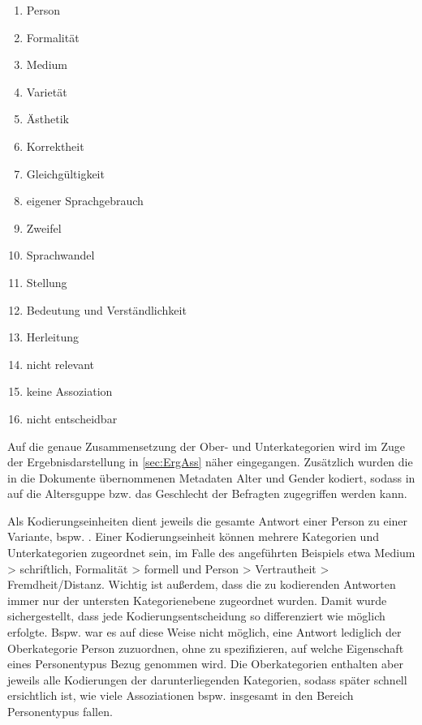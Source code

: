 \begin{multicols}{2}
\begin{enumerate}
\item Person
\item Formalität
\item Medium 
\item Varietät 
\item Ästhetik
\item Korrektheit 
\item Gleichgültigkeit 
\item eigener Sprachgebrauch
\item Zweifel
\item Sprachwandel 
\item Stellung 
\item Bedeutung und Verständlichkeit 
\item Herleitung 
\item nicht relevant 
\item keine Assoziation
\item nicht entscheidbar 
\end{enumerate}
\end{multicols}

\noindent Auf die genaue Zusammensetzung der Ober- und Unterkategorien wird im Zuge der Ergebnisdarstellung in \autoref{sec:ErgAss} näher eingegangen. 
Zusätzlich wurden die in die Dokumente übernommenen Metadaten Alter und Gender kodiert, sodass in \citeauthor{MAXQDA.19892018} auf die Altersguppe bzw. das Geschlecht der Befragten zugegriffen werden kann. 

Als Kodierungseinheiten dient jeweils die gesamte Antwort einer Person zu einer Variante,  bspw. . 
Einer Kodierungseinheit können mehrere Kategorien und Unterkategorien zugeordnet sein, im Falle des angeführten Beispiels  etwa \glqq Medium > schriftlich\grqq, \glqq Formalität > formell\grqq{} und \glqq Person > Vertrautheit > Fremdheit/Distanz\grqq.
Wichtig ist außerdem, dass die zu kodierenden Antworten immer nur der untersten Kategorienebene zugeordnet wurden. 
Damit wurde sichergestellt, dass jede Kodierungsentscheidung so differenziert wie möglich erfolgte.
Bspw. war es auf diese Weise nicht möglich, eine Antwort lediglich der Oberkategorie \glqq Person\grqq{} zuzuordnen, ohne zu spezifizieren, auf welche Eigenschaft eines Personentypus Bezug genommen wird. 
Die Oberkategorien enthalten aber jeweils alle Kodierungen der darunterliegenden Kategorien, sodass später schnell ersichtlich ist, wie viele Assoziationen bspw. insgesamt in den Bereich Personentypus fallen.


